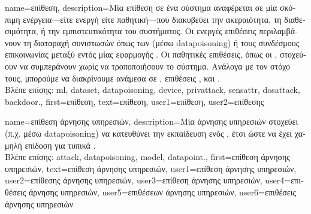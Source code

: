 {name={\foreignlanguage{greek}{επίθεση}},
	description={\foreignlanguage{greek}{Μία επίθεση σε ένα σύστημα}  
		\foreignlanguage{greek}{αναφέρεται σε μία σκόπιμη ενέργεια—είτε ενεργή είτε παθητική—που διακυβεύει την ακεραιότητα,
		τη διαθεσιμότητα, ή την εμπιστευτικότητα του συστήματος. Οι ενεργές επιθέσεις περιλαμβάνουν τη διαταραχή 
		συνιστωσών όπως των}  (\foreignlanguage{greek}{μέσω} \gls{datapoisoning}) 
		\foreignlanguage{greek}{ή τους συνδέσμους επικοινωνίας μεταξύ}  \foreignlanguage{greek}{εντός μίας 
		εφαρμογής} . \foreignlanguage{greek}{Οι παθητικές επιθέσεις, όπως οι} , 
		\foreignlanguage{greek}{στοχεύουν να συμπεράνουν}  \foreignlanguage{greek}{χωρίς να τροποποιήσουν 
		το σύστημα. Ανάλογα με τον στόχο τους, μπορούμε να διακρίνουμε ανάμεσα σε} , 
		\foreignlanguage{greek}{επιθέσεις} , \foreignlanguage{greek}{και} .\\
		\foreignlanguage{greek}{Βλέπε επίσης:} \gls{ml}, \gls{dataset}, \gls{datapoisoning}, \gls{device}, \gls{privattack}, 
		\gls{sensattr}, \gls{dosattack}, \gls{backdoor}.},
	first={\foreignlanguage{greek}{επίθεση}},
	text={\foreignlanguage{greek}{επίθεση}},
	user1={\foreignlanguage{greek}{επίθεση}}, %
  	user2={\foreignlanguage{greek}{επίθεσης}} %
}

{name={\foreignlanguage{greek}{επίθεση άρνησης υπηρεσιών}}, 
	description={\foreignlanguage{greek}{Μία} 
		 \foreignlanguage{greek}{άρνησης υπηρεσιών στοχεύει (π.χ. μέσω} \gls{datapoisoning}) 
		\foreignlanguage{greek}{να κατευθύνει την εκπαίδευση ενός} , 
		\foreignlanguage{greek}{έτσι ώστε να έχει χαμηλή επίδοση για τυπικά} .\\
		\foreignlanguage{greek}{Βλέπε επίσης:} \gls{attack}, \gls{datapoisoning}, \gls{model}, \gls{datapoint}.},
	first={\foreignlanguage{greek}{επίθεση άρνησης υπηρεσιών}},
	text={\foreignlanguage{greek}{επίθεση άρνησης υπηρεσιών}},
	user1={\foreignlanguage{greek}{επίθεση άρνησης υπηρεσιών}}, %
  	user2={\foreignlanguage{greek}{επίθεσης άρνησης υπηρεσιών}}, %
	user3={\foreignlanguage{greek}{επίθεση άρνησης υπηρεσιών}}, %
  	user4={\foreignlanguage{greek}{επιθέσεις άρνησης υπηρεσιών}}, %
	user5={\foreignlanguage{greek}{επιθέσεων άρνησης υπηρεσιών}}, %
  	user6={\foreignlanguage{greek}{επιθέσεις άρνησης υπηρεσιών}} %
}

